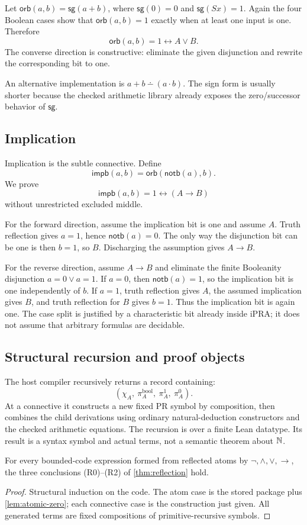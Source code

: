 Let \(\mathsf{orb}(a,b)=\mathsf{sg}(a+b)\), where \(\mathsf{sg}(0)=0\) and
\(\mathsf{sg}(Sx)=1\).  Again the four Boolean cases show that
\(\mathsf{orb}(a,b)=1\) exactly when at least one input is one.  Therefore
\[
  \mathsf{orb}(a,b)=1\leftrightarrow A\vee B.
\]
The converse direction is constructive: eliminate the given disjunction and
rewrite the corresponding bit to one.

An alternative implementation is
\(a+b\dotminus(a\cdot b)\).  The sign form is usually shorter because the
checked arithmetic library already exposes the zero/successor behavior of
\(\mathsf{sg}\).

\subsection{Implication}

Implication is the subtle connective.  Define
\[
  \mathsf{impb}(a,b)=\mathsf{orb}(\mathsf{notb}(a),b).
\]
We prove
\[
  \mathsf{impb}(a,b)=1\leftrightarrow(A\to B)
\]
without unrestricted excluded middle.

For the forward direction, assume the implication bit is one and assume
\(A\).  Truth reflection gives \(a=1\), hence
\(\mathsf{notb}(a)=0\).  The only way the disjunction bit can be one is then
\(b=1\), so \(B\).  Discharging the assumption gives \(A\to B\).

For the reverse direction, assume \(A\to B\) and eliminate the finite
Booleanity disjunction \(a=0\vee a=1\).  If \(a=0\), then
\(\mathsf{notb}(a)=1\), so the implication bit is one independently of \(b\).
If \(a=1\), truth reflection gives \(A\), the assumed implication gives
\(B\), and truth reflection for \(B\) gives \(b=1\).  Thus the implication bit
is again one.  The case split is justified by a characteristic bit already
inside iPRA; it does not assume that arbitrary formulas are decidable.

\subsection{Structural recursion and proof objects}

The host compiler recursively returns a record containing:
\[
  (\chi_A,\ \pi_A^{\mathrm{bool}},\ \pi_A^{1},\ \pi_A^{0}).
\]
At a connective it constructs a new fixed PR symbol by composition, then
combines the child derivations using ordinary natural-deduction constructors
and the checked arithmetic equations.  The recursion is over a finite Lean
datatype.  Its result is a syntax symbol and actual  terms, not a
semantic theorem about \(\mathbb{N}\).

\begin{proposition}
For every bounded-code expression formed from reflected atoms by
\(\neg,\wedge,\vee,\to\), the three conclusions (R0)--(R2) of
\cref{thm:reflection} hold.
\end{proposition}

\begin{proof}
Structural induction on the code.  The atom case is the stored package plus
\cref{lem:atomic-zero}; each connective case is the construction just given.
All generated terms are fixed compositions of primitive-recursive symbols.
\end{proof}
